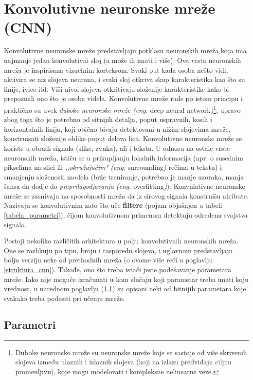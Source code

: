 \documentclass[a4paper]{article}
\begin{document}
\section{Konvolutivne neuronske mreže (CNN)}	
\label{sec:cnn}

Konvolutivne neuronske mreže predstavljaju potklasu neuronskih mreža koja ima najmanje jedan konvolutivni sloj (a može ih imati i više). Ova vrsta neuronskih mreža je inspirisana vizuelnim korteksom. Svaki put kada osoba nešto vidi, aktivira se niz slojeva neurona, i svaki sloj otkriva skup karakteristika kao što su linije, ivice itd. Viši nivoi slojeva otkritivaju složenije karakteristike kako bi prepoznali ono što je osoba videla. Konvolutivne mreže rade po istom principu i praktično su uvek \textit{duboke neuronske mreže (eng.} deep neural network\textit{)}\footnote{Duboke neuronske mreže su neuronske mreže koje se sastoje od više skrivenih slojeva između ulaznih i izlaznih slojeva (koji na izlazu predviđaju ciljnu promenljivu), koje mogu modelovati i kompleksne nelinearne veze.}, upravo zbog toga što je potrebno od sitnijih detalja, poput uspravnih, kosih i horizontalnih linija, koji obično bivaju detektovani u nižim slojevima mreže, konstruisati složenije oblike poput delova lica. Konvolutivne neuronske mreže se koriste u obradi signala (slike, zvuka), ali i teksta. U odnosu na ostale vrste neuronskih mreža, ističu se u prikupljanju lokalnih informacija (npr. o susednim pikselima na slici ili \textit{,,okružujućim" (eng.} surrounding\textit{)} rečima u tekstu) i smanjenju složenosti modela (brže treniranje, potrebno je manje uzoraka, manja šansa da dodje do \textit{preprilagodjavanja (eng.} overfitting\textit{)}). Konvulativne neuronske mreže se zasnivaju na sposobnosti mreža da iz sirovog signala konstruišu atribute. Nazivaju se konvolutivnim zato što uče \textbf{filtere} (pojam objašnjen u tabeli \ref{tabela_parametri}), čijom konvolutivnom primenom detektuju određena svojstva signala.

Postoji nekoliko različitih arhitektura u polju konvolutivnih neuronskih mreža. One se razlikuju po tipu, broju i rasporedu slojeva, i uglavnom predstavljaju bolju verziju neke od prethodnih mreža (o ovome više reči u poglavlju \ref{struktura_cnn}). Takođe, ono što treba istaći jeste podešavanje parametara mreže. Iako nije moguće izračunati u kom slučaju koji parametar treba imati koju vrednost, u narednom poglavlju (\ref{parametri_sec}) su opisani neki od bitnijih parametara koje svakako treba podesiti pri učenju mreže.


\subsection{Parametri}
\label{parametri_sec}
\end{document}
